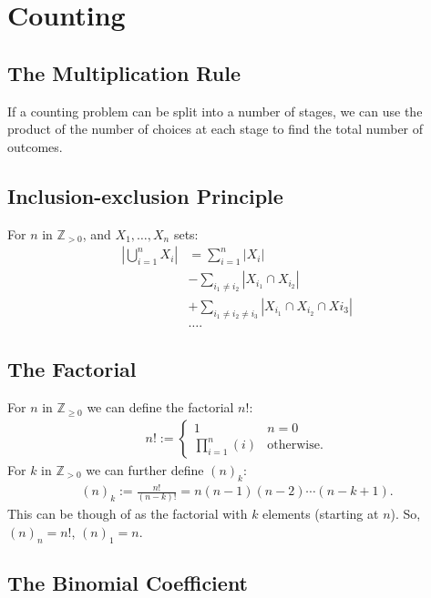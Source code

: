 \section{Counting}

\subsection{The Multiplication Rule}

If a counting problem can be split into a number of stages, we can
use the product of the number of choices at each stage to find
the total number of outcomes.

\subsection{Inclusion-exclusion Principle}

For $n$ in $\mathbb{Z}_{> 0}$, and $X_1, \ldots, X_n$ sets: \begin{align*}
  \left|\bigcup_{i = 1}^n X_i\right| &= \sum_{i = 1}^n |X_i| \\
  &-\sum_{i_1 \neq i_2} |X_{i_1} \cap X_{i_2}| \\
  &+\sum_{i_1 \neq i_2 \neq i_3} |X_{i_1} \cap X_{i_2} \cap X{i_3}| \\
  &\ldots.
\end{align*}

\subsection{The Factorial}

For $n$ in $\mathbb{Z}_{\geq 0}$ we can define the factorial $n!$: \begin{align*}
  n! := \begin{cases*}
    1 & n = 0 \\
    \prod_{i = 1}^n(i) & \text{otherwise.}
  \end{cases*}
\end{align*} For $k$ in $\mathbb{Z}_{> 0}$ we can further define $(n)_k$: \begin{gather*}
  (n)_k := \frac{n!}{(n-k)!} = n(n-1)(n-2)\cdots(n-k+1).
\end{gather*} This can be though of as the factorial with $k$
elements (starting at $n$). So, $(n)_n = n!$, $(n)_1 = n$.

\subsection{The Binomial Coefficient}

